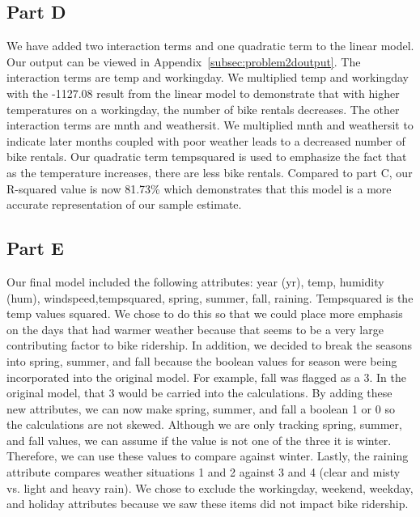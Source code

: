 \documentclass[11pt]{article}
\begin{document}
\subsection{Part D}
\label{subsec:2d}
We have added two interaction terms and one quadratic term to the linear model. Our output can be viewed in Appendix~\ref{subsec:problem2doutput}. The interaction terms are temp and workingday. We multiplied temp and workingday with the -1127.08 result from the linear model to demonstrate that with higher temperatures on a workingday, the number of bike rentals decreases. The other interaction terms are  mnth and weathersit. We multiplied mnth and weathersit to indicate later months coupled with poor weather leads to a decreased number of bike rentals. Our quadratic term tempsquared is used to emphasize the fact that as the temperature increases, there are less bike rentals.  
Compared to part C, our R-squared value is now 81.73\% which demonstrates that this model is a more accurate representation of our sample estimate. 
\subsection{Part E}
\label{subsec:2e}
Our final model included the following attributes: year (yr), temp, humidity (hum), windspeed,tempsquared, spring, summer, fall, raining. Tempsquared is the temp values squared. We chose to do this so that we could place more emphasis on the days that had warmer weather because that seems to be a very large contributing factor to bike ridership. In addition, we decided to break the seasons into spring, summer, and fall because the boolean values for season were being incorporated into the original model. For example, fall was flagged as a 3. In  the original model, that 3 would be carried into the calculations. By adding these new attributes, we can now make spring, summer, and fall a boolean 1 or 0 so the calculations are not skewed. Although we are only tracking spring, summer, and fall values, we can assume if the value is not one of the three it is winter. Therefore, we can use these values to compare against winter. Lastly, the raining attribute compares weather situations 1 and 2 against 3 and 4 (clear and misty vs. light and heavy rain). We chose to exclude the workingday, weekend, weekday, and holiday attributes because we saw these items did not impact bike ridership.
\end{document}
